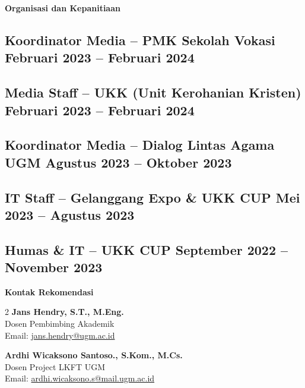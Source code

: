 \documentclass[a4paper,11pt]{article}
\begin{document}
	\medskip
	\begin{center}
		{\large\bfseries Organisasi dan Kepanitiaan}\\[-0.6em]
		\noindent\makebox[\linewidth]{\rule{\textwidth}{0.4pt}}
	\end{center}
	
	\subsection{\textnormal{Koordinator Media – PMK Sekolah Vokasi \hfill Februari 2023 – Februari 2024}}	
	\subsection{\textnormal{Media Staff – UKK (Unit Kerohanian Kristen) \hfill Februari 2023 – Februari 2024}}	
	\subsection{\textnormal{Koordinator Media – Dialog Lintas Agama UGM \hfill Agustus 2023 – Oktober 2023}}	
	\subsection{\textnormal{IT Staff – Gelanggang Expo \& UKK CUP \hfill Mei 2023 – Agustus 2023}}	
	\subsection{\textnormal{Humas \& IT – UKK CUP \hfill September 2022 – November 2023}}	
	
	\vspace{1em}
	\begin{center}
		{\large\bfseries Kontak Rekomendasi}\\[-0.6em]
		\noindent\makebox[\linewidth]{\rule{\textwidth}{0.4pt}}
	\end{center}
	
	\begin{center}
		\begin{multicols}{2}
			\textbf{Jans Hendry, S.T., M.Eng.} \\
			Dosen Pembimbing Akademik \\
			Email: \href{mailto:jans.hendry@ugm.ac.id }{jans.hendry@ugm.ac.id }
			
			\vfill\null
			\columnbreak
			
			\textbf{Ardhi Wicaksono Santoso., S.Kom., M.Cs.} \\
			Dosen Project LKFT UGM\\
			Email: \href{mailto:ardhi.wicaksono.s@mail.ugm.ac.id}{ardhi.wicaksono.s@mail.ugm.ac.id} 
		\end{multicols}
	\end{center}
\end{document}
